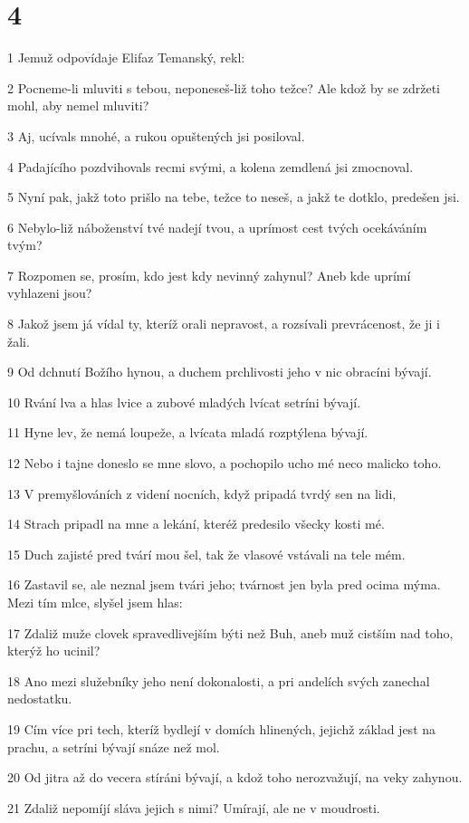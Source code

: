 \chapter{4}

\par 1 Jemuž odpovídaje Elifaz Temanský, rekl:
\par 2 Pocneme-li mluviti s tebou, neponeseš-liž toho težce? Ale kdož by se zdržeti mohl, aby nemel mluviti?
\par 3 Aj, ucívals mnohé, a rukou opuštených jsi posiloval.
\par 4 Padajícího pozdvihovals recmi svými, a kolena zemdlená jsi zmocnoval.
\par 5 Nyní pak, jakž toto prišlo na tebe, težce to neseš, a jakž te dotklo, predešen jsi.
\par 6 Nebylo-liž náboženství tvé nadejí tvou, a uprímost cest tvých ocekáváním tvým?
\par 7 Rozpomen se, prosím, kdo jest kdy nevinný zahynul? Aneb kde uprímí vyhlazeni jsou?
\par 8 Jakož jsem já vídal ty, kteríž orali nepravost, a rozsívali prevrácenost, že ji i žali.
\par 9 Od dchnutí Božího hynou, a duchem prchlivosti jeho v nic obracíni bývají.
\par 10 Rvání lva a hlas lvice a zubové mladých lvícat setríni bývají.
\par 11 Hyne lev, že nemá loupeže, a lvícata mladá rozptýlena bývají.
\par 12 Nebo i tajne doneslo se mne slovo, a pochopilo ucho mé neco malicko toho.
\par 13 V premyšlováních z videní nocních, když pripadá tvrdý sen na lidi,
\par 14 Strach pripadl na mne a lekání, kteréž predesilo všecky kosti mé.
\par 15 Duch zajisté pred tvárí mou šel, tak že vlasové vstávali na tele mém.
\par 16 Zastavil se, ale neznal jsem tvári jeho; tvárnost jen byla pred ocima mýma. Mezi tím mlce, slyšel jsem hlas:
\par 17 Zdaliž muže clovek spravedlivejším býti než Buh, aneb muž cistším nad toho, kterýž ho ucinil?
\par 18 Ano mezi služebníky jeho není dokonalosti, a pri andelích svých zanechal nedostatku.
\par 19 Cím více pri tech, kteríž bydlejí v domích hlinených, jejichž základ jest na prachu, a setríni bývají snáze než mol.
\par 20 Od jitra až do vecera stíráni bývají, a kdož toho nerozvažují, na veky zahynou.
\par 21 Zdaliž nepomíjí sláva jejich s nimi? Umírají, ale ne v moudrosti.

